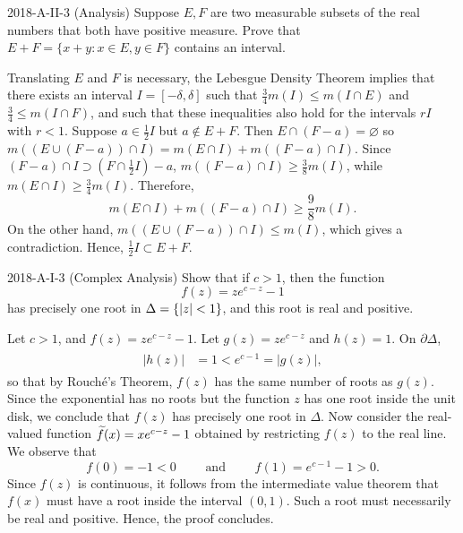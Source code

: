 \documentclass{article}
\begin{document}
\begin{prb}{2018-A-II-3 (Analysis)}
	Suppose $E, F$ are two measurable subsets of the real numbers that both have positive measure. Prove that $E + F = \{x + y: x \in E, y \in F\}$ contains an interval. 
\end{prb}
\begin{solutions}
	Translating $E$ and $F$ is necessary, the Lebesgue Density Theorem implies that there exists an interval $I= [-\delta, \delta]$ such that $\frac{3}{4}m(I) \leq m(I \cap E)$ and $\frac{3}{4}\leq m(I \cap F)$, and such that these inequalities also hold for the intervals $rI$ with $r < 1$. Suppose $a \in \frac{1}{2}I$ but $a \notin E + F$. Then $E \cap (F - a) = \varnothing$ so $m((E \cup (F - a)) \cap I) = m(E \cap I) + m((F - a) \cap I)$. Since $(F - a) \cap I \supset (F \cap \frac{1}{2}I) - a$, $m((F - a)\cap I) \geq \frac{3}{8}m(I)$, while $m(E \cap I) \geq \frac{3}{4}m(I)$. Therefore, 
		\begin{equation}
			m(E \cap I) + m((F - a)\cap I) \geq \frac{9}{8}m(I). 
		\end{equation}
	On the other hand, $m((E \cup (F - a))\cap I) \leq m(I)$, which gives a contradiction. Hence, $\frac{1}{2}I \subset E + F$. 
\end{solutions} 


\begin{prb}{2018-A-I-3 (Complex Analysis)}
	Show that if $c > 1$, then the function 
		\begin{equation*}
			f(z) = ze^{c - z} -1
		\end{equation*}
	has precisely one root in $\Delta = \{\left| z \right| < 1\}$, and this root is real and positive. 
\end{prb}
\begin{solutions}
	Let $c > 1$, and $f(z) = ze^{c - z} - 1$. Let $g(z) = ze^{c - z}$ and $h(z) =1$. On $\partial \Delta$, 
		\begin{align}
			\begin{split}
				|h(z)| &= 1 < e^{c - 1} = |g(z)|,
			\end{split}
		\end{align}
	so that by Rouch{\'e}'s Theorem, $f(z)$ has the same number of roots as $g(z)$. Since the exponential has no roots but the function $z$ has one root inside the unit disk, we conclude that $f(z)$ has precisely one root in $\Delta$. Now consider the real-valued function $\widetilde{f}(x) = xe^{c - z} - 1$ obtained by restricting $f(z)$ to the real line. We observe that 
		\begin{equation}
			f(0) = -1 < 0 \qquad \text{ and } \qquad f(1) = e^{c - 1} - 1 > 0. 
		\end{equation}
	Since $f(z)$ is continuous, it follows from the intermediate value theorem that $f(x)$ must have a root inside the interval $(0,1)$. Such a root must necessarily be real and positive. Hence, the proof concludes. 
\end{solutions}
\end{document}
